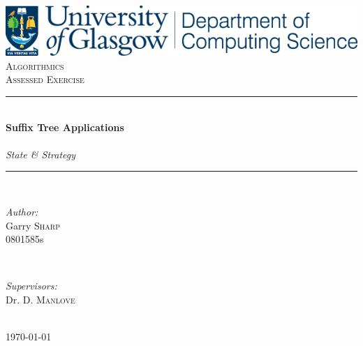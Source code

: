 \documentclass[12pt]{article} %
\begin{document}

\begin{titlepage}

\newcommand{\HRule}{\rule{\linewidth}{0.5mm}} %
\center %
\includegraphics[width=\textwidth]{Glasgow}\\[1.5cm]
\textsc{\LARGE Algorithmics}\\[0.5cm] %
\textsc{\Large Assessed Exercise}\\[0.5cm] %

\HRule \\[0.4cm]
{ \huge \bfseries Suffix Tree Applications}\\[0.4cm]
\\
\emph{State \& Strategy}
\HRule \\[1.5cm]

\begin{minipage}{0.4\textwidth}
\begin{flushleft} \large
\emph{Author:}\\
Garry \textsc{Sharp}\\
0801585s\\ %
\end{flushleft}
\end{minipage}
~
\begin{minipage}{0.4\textwidth}
\begin{flushright} \large
\emph{Supervisors:} \\
Dr. D. \textsc{Manlove}\\ %
\end{flushright}
\end{minipage}\\[4cm]

{\large \today}\\[3cm] %

\vfill %

\end{titlepage}
\end{document}
